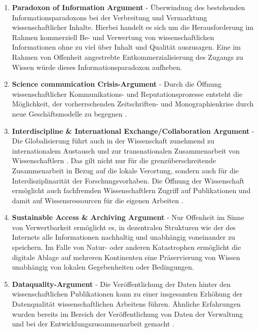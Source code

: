 \begin{enumerate}
\item \textbf{Paradoxon of Information Argument} - Überwindung des bestehenden Informationsparadoxons bei der Verbreitung und Vermarktung wissenschaftlicher Inhalte. Hierbei handelt es sich um die Herausforderung im Rahmen kommerziell Be- und Verwertung von wissenschaftlichen Informationen ohne zu viel über Inhalt und Qualität auszusagen. Eine im Rahmen von Offenheit angestrebte Entkommerzialisierung des Zugangs zu Wissen würde dieses Informationsparadoxon aufheben.
\item \textbf{Science communication Crisis-Argument} - Durch die Öffnung wissenschaftlicher Kommunikations- und Reputationsprozesse entsteht die Möglichkeit, der vorherrschenden Zeitschriften- und Monographienkrise durch neue Geschäftsmodelle zu begegnen \cite{muller_2010_open}.
\item \textbf{Interdiscipline & International Exchange/Collaboration Argument} - Die Globalisierung führt auch in der Wissenschaft zunehmend zu internationalem Austausch und zur transnationalen Zusammenarbeit von Wissenschaftlern \cite{Waltman_2011}. Das gilt nicht nur für die grenzüberschreitende Zusammenarbeit in Bezug auf die lokale Verortung, sondern auch für die Interdisziplinarität der Forschungsvorhaben. Die Öffnung der Wissenschaft ermöglicht auch fachfremden Wissenschaftlern Zugriff auf Publikationen und damit auf Wissensressourcen für die eigenen Arbeiten \cite{suchen}.
\item \textbf{Sustainable Access & Archiving Argument} - Nur Offenheit im Sinne von Verwertbarkeit ermöglicht es, in dezentralen Strukturen wie der des Internets alle Informationen nachhaltig und unabhängig voneinander zu speichern. Im Falle von Natur- oder anderen Katastrophen ermöglicht die digitale Ablage auf mehreren Kontinenten eine Präservierung von Wissen unabhängig von lokalen Gegebenheiten oder Bedingungen.
\item \textbf{Dataquality-Argument} - Die Veröffentlichung der Daten hinter den wissenschaftlichen Publikationen kann zu einer insgesamten Erhöhung der Datenqualität wissenschaftlichen Arbeitens führen. Ähnliche Erfahrungen wurden bereits im Bereich der Veröffentlichung von Daten der Verwaltung und bei der Entwicklungszusammenarbeit gemacht \cite{heise_2014_bundestag}.
\end{enumerate}

